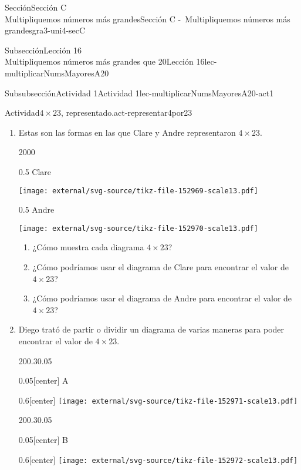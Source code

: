 \begin{sectionptx}{Sección}{{\Large Sección C\\}Multipliquemos números más grandes}{}{Sección C -~Multipliquemos números más grandes}{}{}{gra3-uni4-secC}
\begin{subsectionptx}{Subsección}{{\normalsize Lección 16\\[-0.05cm]}Multipliquemos números más grandes que 20}{}{Lección 16}{}{}{lec-multiplicarNumsMayoresA20}
%
\begin{subsubsectionptx}{Subsubsección}{Actividad 1}{}{Actividad 1}{}{}{lec-multiplicarNumsMayoresA20-act1}
\begin{activity}{Actividad}{\(4\times 23\), representado.}{act-representar4por23}%
%
\begin{enumerate}
\item{}Estas son las formas en las que Clare y Andre representaron \(4\times 23\).%
\begin{sidebyside}{2}{0}{0}{0}%
\begin{sbspanel}{0.5}%
Clare%
\par
\texttt{[image: external/svg-source/tikz-file-152969-scale13.pdf]}
\end{sbspanel}%
\begin{sbspanel}{0.5}%
Andre%
\par
\texttt{[image: external/svg-source/tikz-file-152970-scale13.pdf]}
\end{sbspanel}%
\end{sidebyside}%
%
\begin{enumerate}
\item{}¿Cómo muestra cada diagrama \(4\times 23\)?%
\item{}¿Cómo podríamos usar el diagrama de Clare para encontrar el valor de \(4\times 23\)?%
\item{}¿Cómo podríamos usar el diagrama de Andre para encontrar el valor de \(4\times 23\)?%
\end{enumerate}
\clearpage
\item{}Diego trató de partir o dividir un diagrama de varias maneras para poder encontrar el valor de \(4\times 23\).%
\begin{sidebyside}{2}{0}{0.3}{0.05}%
\begin{sbspanel}{0.05}[center]%
A%
\end{sbspanel}%
\begin{sbspanel}{0.6}[center]%
\texttt{[image: external/svg-source/tikz-file-152971-scale13.pdf]}
\end{sbspanel}%
\end{sidebyside}%
\begin{sidebyside}{2}{0}{0.3}{0.05}%
\begin{sbspanel}{0.05}[center]%
B%
\end{sbspanel}%
\begin{sbspanel}{0.6}[center]%
\texttt{[image: external/svg-source/tikz-file-152972-scale13.pdf]}

\end{sbspanel}
\end{sidebyside}
\end{enumerate}
\end{activity}
\end{subsubsectionptx}
\end{subsectionptx}
\end{sectionptx}
